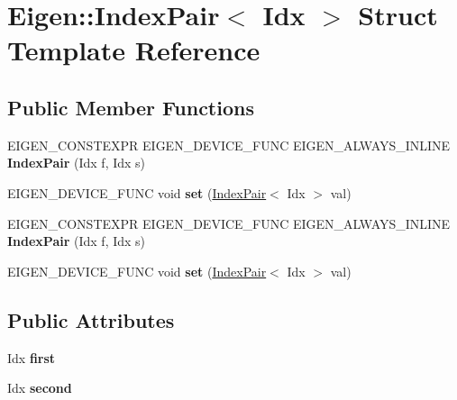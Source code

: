 \hypertarget{struct_eigen_1_1_index_pair}{}\section{Eigen\+:\+:Index\+Pair$<$ Idx $>$ Struct Template Reference}
\label{struct_eigen_1_1_index_pair}
\subsection*{Public Member Functions}
\begin{DoxyCompactItemize}
\item 
\mbox{\label{struct_eigen_1_1_index_pair_ab7cfad050e007f4101a81a21ab5c8531}} 
E\+I\+G\+E\+N\+\_\+\+C\+O\+N\+S\+T\+E\+X\+PR E\+I\+G\+E\+N\+\_\+\+D\+E\+V\+I\+C\+E\+\_\+\+F\+U\+NC E\+I\+G\+E\+N\+\_\+\+A\+L\+W\+A\+Y\+S\+\_\+\+I\+N\+L\+I\+NE {\bfseries Index\+Pair} (Idx f, Idx s)
\item 
\mbox{\label{struct_eigen_1_1_index_pair_a4da3b9ad3d7979f2a0edf42b020cd876}} 
E\+I\+G\+E\+N\+\_\+\+D\+E\+V\+I\+C\+E\+\_\+\+F\+U\+NC void {\bfseries set} (\hyperlink{struct_eigen_1_1_index_pair}{Index\+Pair}$<$ Idx $>$ val)
\item 
\mbox{\label{struct_eigen_1_1_index_pair_ab7cfad050e007f4101a81a21ab5c8531}} 
E\+I\+G\+E\+N\+\_\+\+C\+O\+N\+S\+T\+E\+X\+PR E\+I\+G\+E\+N\+\_\+\+D\+E\+V\+I\+C\+E\+\_\+\+F\+U\+NC E\+I\+G\+E\+N\+\_\+\+A\+L\+W\+A\+Y\+S\+\_\+\+I\+N\+L\+I\+NE {\bfseries Index\+Pair} (Idx f, Idx s)
\item 
\mbox{\label{struct_eigen_1_1_index_pair_a4da3b9ad3d7979f2a0edf42b020cd876}} 
E\+I\+G\+E\+N\+\_\+\+D\+E\+V\+I\+C\+E\+\_\+\+F\+U\+NC void {\bfseries set} (\hyperlink{struct_eigen_1_1_index_pair}{Index\+Pair}$<$ Idx $>$ val)
\end{DoxyCompactItemize}
\subsection*{Public Attributes}
\begin{DoxyCompactItemize}
\item 
\mbox{\label{struct_eigen_1_1_index_pair_a6353533a4ca3f3c50d39465fa850f123}} 
Idx {\bfseries first}
\item 
\mbox{\label{struct_eigen_1_1_index_pair_a77c0f19ab2659e973e9a56e2440a5004}} 
Idx {\bfseries second}
\end{DoxyCompactItemize}


